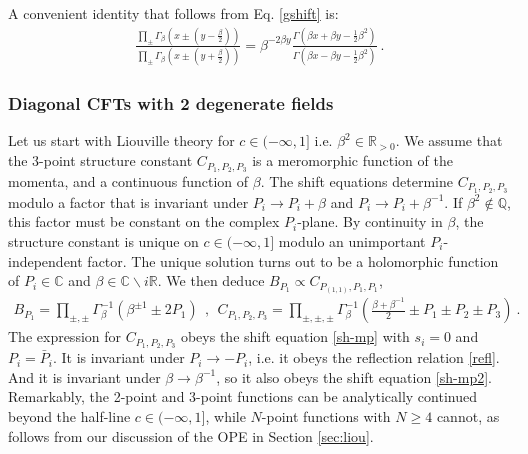 \documentclass[12pt, a4paper]{article}
\begin{document}
A convenient identity that follows from Eq. \eqref{gshift} is:
\begin{align}
 \frac{\prod_\pm \Gamma_\beta\left(x \pm (y-\frac{\beta}{2})\right)}{\prod_\pm \Gamma_\beta\left(x \pm (y+\frac{\beta}{2})\right)} = \beta^{-2\beta y}\frac{\Gamma\left(\beta x+\beta y - \frac12 \beta^2\right)}{\Gamma\left(\beta x-\beta y -\frac12 \beta^2\right)}\ .
\end{align}

\subsubsection{Diagonal CFTs with 2 degenerate fields}\label{sec:dtdf}

Let us start with Liouville theory for $c\in (-\infty ,1]$ i.e. $\beta^2\in\mathbb{R}_{>0}$. 
We assume that the 3-point structure constant $C_{P_1,P_2,P_3}$ is a meromorphic function of the momenta, and a continuous function of $\beta$.
The shift equations determine $C_{P_1,P_2,P_3}$ modulo a factor that is invariant under $P_i\to P_i+\beta$ and $P_i\to P_i+\beta^{-1}$. 
If $\beta^2\notin \mathbb{Q}$, this factor must be constant on the complex $P_i$-plane. By continuity in $\beta$, the structure constant is unique on $c\in (-\infty,1]$ modulo an unimportant $P_i$-independent factor. The unique solution turns out to be a holomorphic function of $P_i\in\mathbb{C}$ and $\beta\in \mathbb{C}\backslash i\mathbb{R}$. We then deduce $B_{P_1}\propto C_{P_{(1,1)},P_1,P_1}$,
\begin{align}
 \boxed{B_{P_1} = \prod_{\pm,\pm}\Gamma_\beta^{-1}\left(\beta^{\pm 1}\pm 2P_1\right)} 
  \ \  , \ \
  \boxed{C_{P_1,P_2,P_3} =\prod_{\pm,\pm,\pm} \Gamma_\beta^{-1}\left(\tfrac{\beta+\beta^{-1}}{2} \pm P_1\pm P_2\pm P_3\right)}
 \ . 
 \label{bc}
\end{align}
The expression for $C_{P_1,P_2,P_3}$ obeys the shift equation \eqref{sh-mp} with $s_i=0$ and $P_i=\bar P_i$.
It is invariant under $P_i\to -P_i$, i.e. it obeys the reflection relation \eqref{refl}.
And it is invariant under $\beta \to \beta^{-1}$, so it also obeys the shift equation \eqref{sh-mp2}. 
Remarkably, the 2-point and 3-point functions can be analytically continued beyond the half-line $c\in (-\infty ,1]$, while $N$-point functions with $N\geq 4$ cannot, as follows from our discussion of the OPE in Section \ref{sec:liou}. 
\end{document}
